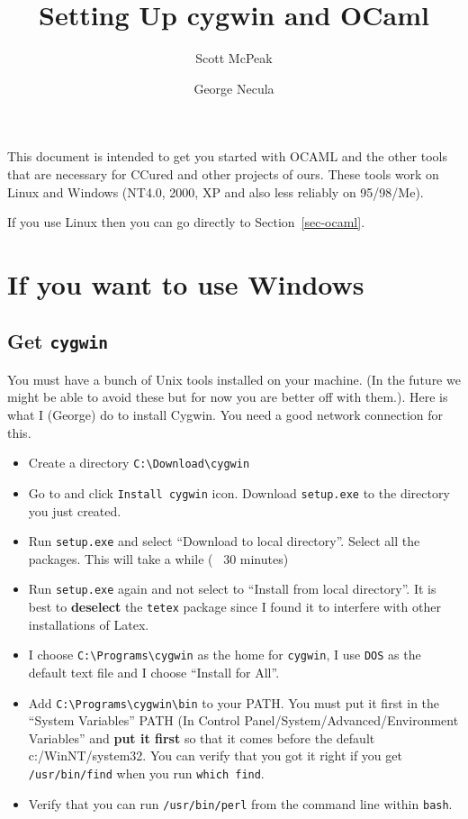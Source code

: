 \documentclass{article}
\title{Setting Up cygwin and OCaml}
\author{Scott McPeak \and George Necula}
\def\t#1{{\tt #1}}
\begin{document}
\maketitle

 This document is intended to get you started with OCAML and the other tools
that are necessary for CCured and other projects of ours. These tools work on
Linux and Windows (NT4.0, 2000, XP and also less reliably on 95/98/Me).

 If you use Linux then you can go directly to Section~\ref{sec-ocaml}.

\section{If you want to use Windows}

 \subsection{Get \t{cygwin}}

 You must have a bunch of Unix tools installed on your machine. (In the future
we might be able to avoid these but for now you are better off with them.).
Here is what I (George) do to install Cygwin. You need a good network
connection for this. 
\begin{itemize}
\item Create a directory \t{C:\backslash Download\backslash cygwin}
\item Go to  and click \t{Install
cygwin} icon. Download \t{setup.exe} to the directory you just created.
\item Run \t{setup.exe} and select ``Download to local directory''. Select all
the packages. This will take a while (~ 30 minutes)
\item Run \t{setup.exe} again and not select to ``Install from local
directory''. It is best to {\bf deselect} the \t{tetex} package since I found
it to interfere with other installations of Latex.
\item I choose \t{C:\backslash Programs\backslash cygwin} 
as the home for \t{cygwin}, I use \t{DOS} as the default text file and I
choose ``Install for All''. 
\item Add \t{C:\backslash Programs\backslash cygwin\backslash bin} to your
PATH. You must put it first in the ``System Variables'' PATH (In Control Panel/System/Advanced/Environment
Variables'' and {\bf put it first} so that it comes before the default
c:/WinNT/system32. You can verify that you got it right if you get
\t{/usr/bin/find} when you run \t{which find}. 
\item Verify that you can run \t{/usr/bin/perl} from the command line within
\t{bash}. 
\end{itemize}
\end{document}

